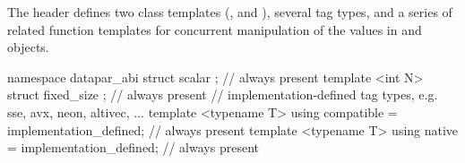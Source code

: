 

\pnum
The header  defines two class templates (\datapar, and \mask), several tag types, and a series of related function templates for concurrent manipulation of the values in \datapar and \mask objects.


\begin{itemdecl}
namespace datapar_abi {
  struct scalar {};  // always present
  template <int N> struct fixed_size {};  // always present
  // implementation-defined tag types, e.g. sse, avx, neon, altivec, ...
  template <typename T> using compatible = implementation_defined;  // always present
  template <typename T> using native = implementation_defined;  // always present
}
\end{itemdecl}
